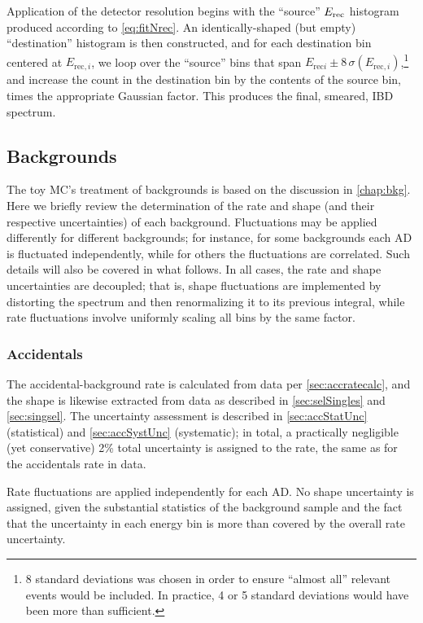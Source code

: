 \documentclass[../thesis.tex]{subfiles}
\begin{document}
Application of the detector resolution begins with the ``source'' $E_\mathrm{rec}$ histogram produced according to \autoref{eq:fitNrec}. An identically-shaped (but empty) ``destination'' histogram is then constructed, and for each destination bin centered at $E_{\mathrm{rec},i}$, we loop over the ``source'' bins that span $E_{\mathrm{rec}i} \pm 8\,\sigma(E_{\mathrm{rec},i})$,\footnote{8 standard deviations was chosen in order to ensure ``almost all'' relevant events would be included. In practice, 4 or 5 standard deviations would have been more than sufficient.} and increase the count in the destination bin by the contents of the source bin, times the appropriate Gaussian factor. This produces the final, smeared, IBD spectrum.

\subsection{Backgrounds}
\label{sec:fitToyBackgrounds}

The toy MC's treatment of backgrounds is based on the discussion in \autoref{chap:bkg}. Here we briefly review the determination of the rate and shape (and their respective uncertainties) of each background. Fluctuations may be applied differently for different backgrounds; for instance, for some backgrounds each AD is fluctuated independently, while for others the fluctuations are correlated. Such details will also be covered in what follows. In all cases, the rate and shape uncertainties are decoupled; that is, shape fluctuations are implemented by distorting the spectrum and then renormalizing it to its previous integral, while rate fluctuations involve uniformly scaling all bins by the same factor.

\subsubsection{Accidentals}

The accidental-background rate is calculated from data per \autoref{sec:accratecalc}, and the shape is likewise extracted from data as described in \autoref{sec:selSingles} and \autoref{sec:singsel}. The uncertainty assessment is described in \autoref{sec:accStatUnc} (statistical) and \autoref{sec:accSystUnc} (systematic); in total, a practically negligible (yet conservative) 2\% total uncertainty is assigned to the rate, the same as for the accidentals rate in data.

Rate fluctuations are applied independently for each AD. No shape uncertainty is assigned, given the substantial statistics of the background sample and the fact that the uncertainty in each energy bin is more than covered by the overall rate uncertainty.
\end{document}
